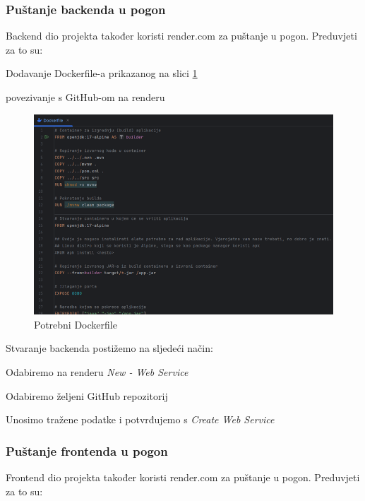 			\subsubsection{Puštanje backenda u pogon}

			Backend dio projekta također koristi render.com za puštanje u pogon. Preduvjeti za to su:
			\begin{packed_item}
				\item Dodavanje Dockerfile-a prikazanog na slici \ref{fig:dockerfile}
				\item povezivanje s GitHub-om na renderu
			\end{packed_item}

			\begin{figure}[H]
				\includegraphics[scale=1]{slike/dockerfile.png}
				\centering
				\caption{Potrebni Dockerfile}
				\label{fig:dockerfile}
			\end{figure}

			Stvaranje backenda postižemo na sljedeći način:
			\begin{packed_item}
				\item Odabiremo na renderu \textit{New - Web Service}
				\item Odabiremo željeni GitHub repozitorij
				\item Unosimo tražene podatke i potvrđujemo s \textit{Create Web Service}
			\end{packed_item}

			\subsubsection{Puštanje frontenda u pogon}

			Frontend dio projekta također koristi render.com za puštanje u pogon. Preduvjeti za to su:
			
